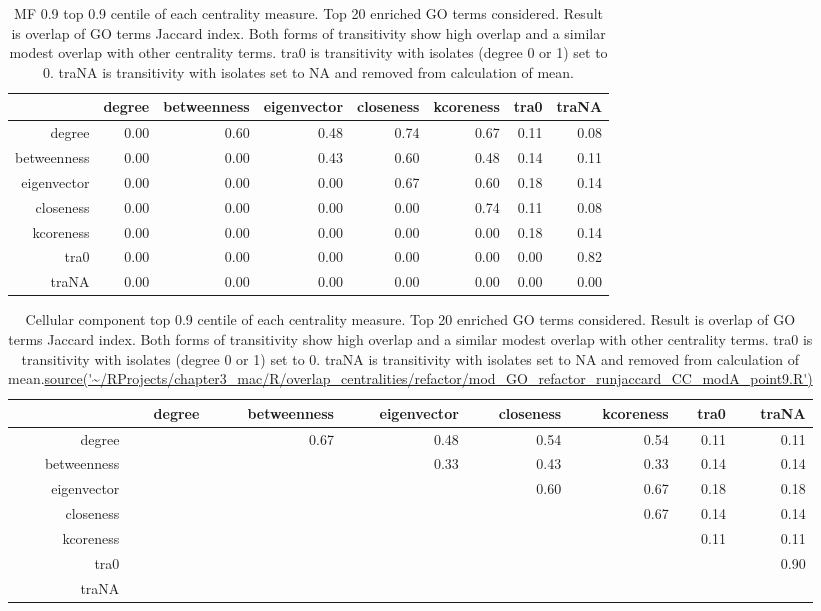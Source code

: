 \begin{table}[ht]
\centering
\begin{tabular}{rrrrrrrr}
  \hline
 & degree & betweenness & eigenvector & closeness & kcoreness & tra0 & traNA \\ 
  \hline
degree & 0.00 & 0.60 & 0.48 & 0.74 & 0.67 & 0.11 & 0.08 \\ 
  betweenness & 0.00 & 0.00 & 0.43 & 0.60 & 0.48 & 0.14 & 0.11 \\ 
  eigenvector & 0.00 & 0.00 & 0.00 & 0.67 & 0.60 & 0.18 & 0.14 \\ 
  closeness & 0.00 & 0.00 & 0.00 & 0.00 & 0.74 & 0.11 & 0.08 \\ 
  kcoreness & 0.00 & 0.00 & 0.00 & 0.00 & 0.00 & 0.18 & 0.14 \\ 
  tra0 & 0.00 & 0.00 & 0.00 & 0.00 & 0.00 & 0.00 & 0.82 \\ 
  traNA & 0.00 & 0.00 & 0.00 & 0.00 & 0.00 & 0.00 & 0.00 \\ 
   \hline
\end{tabular}
\caption{MF 0.9 top 0.9 centile of each centrality measure. Top 20 enriched GO terms considered. Result is overlap of GO terms Jaccard index. Both forms of transitivity show high overlap and a similar modest overlap with other centrality terms. tra0 is transitivity with isolates (degree 0 or 1) set to 0. traNA is transitivity with isolates set to NA and removed from calculation of mean.} 
\end{table}



\begin{table}[ht]
\centering
\begin{tabular}{rrrrrrrr}
  \hline
 & degree & betweenness & eigenvector & closeness & kcoreness & tra0 & traNA \\ 
  \hline
degree &  & 0.67 & 0.48 & 0.54 & 0.54 & 0.11 & 0.11 \\ 
  betweenness &  &  & 0.33 & 0.43 & 0.33 & 0.14 & 0.14 \\ 
  eigenvector &  &  &  & 0.60 & 0.67 & 0.18 & 0.18 \\ 
  closeness &  &  &  &  & 0.67 & 0.14 & 0.14 \\ 
  kcoreness &  &  &  &  &  & 0.11 & 0.11 \\ 
  tra0 &  &  &  &  &  &  & 0.90 \\ 
  traNA &  &  &  &  &  &  &  \\ 
   \hline
\end{tabular}
\caption{Cellular component top 0.9 centile of each centrality measure. Top 20 enriched GO terms considered. Result is overlap of GO terms Jaccard index. Both forms of transitivity show high overlap and a similar modest overlap with other centrality terms. tra0 is transitivity with isolates (degree 0 or 1) set to 0. traNA is transitivity with isolates set to NA and removed from calculation of mean.\url{source('~/RProjects/chapter3_mac/R/overlap_centralities/refactor/mod_GO_refactor_runjaccard_CC_modA_point9.R')} }

\end{table}

